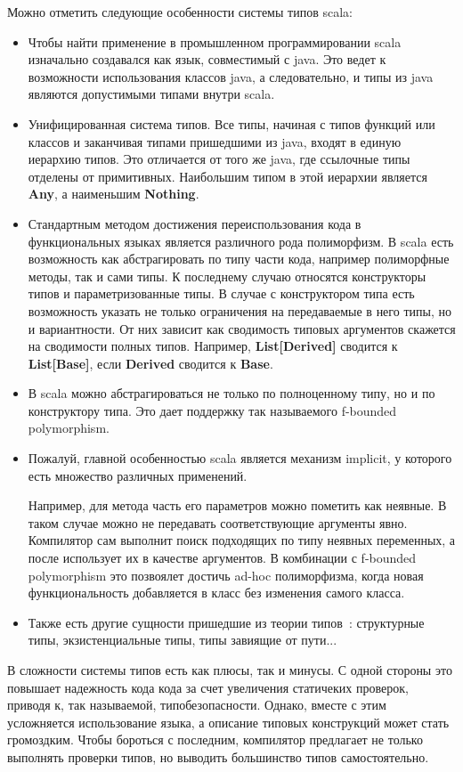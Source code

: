 Можно отметить следующие особенности системы типов scala:
\begin{itemize}
  \item Чтобы найти применение в промышленном программировании scala изначально
  создавался как язык, совместимый с java.
  Это ведет к возможности использования классов java, а следовательно, и типы
  из java являются допустимыми типами внутри scala.
  \item Унифицированная система типов. Все типы, начиная с типов функций или
  классов и заканчивая типами пришедшими из java, входят в единую иерархию типов.
  Это отличается от того же java, где ссылочные типы отделены от примитивных.
  Наибольшим типом в этой иерархии является \textbf{Any}, а наименьшим
  \textbf{Nothing}.
  \item Стандартным методом достижения переиспользования кода
  в функциональных языках является различного рода полиморфизм.
  В scala есть возможность как абстрагировать по типу части кода,
  например полиморфные методы, так и сами типы.
  К последнему случаю относятся конструкторы типов и параметризованные типы.
  В случае с конструктором типа есть возможность указать не только ограничения
  на передаваемые в него типы, но и вариантности.
  От них зависит как сводимость типовых аргументов скажется на
  сводимости полных типов.
  Например, \textbf{List[Derived]} сводится к \textbf{List[Base]}, если
  \textbf{Derived} сводится к \textbf{Base}.
  \item В scala можно абстрагироваться не только по полноценному типу,
  но и по конструктору типа.
  Это дает поддержку так называемого f-bounded polymorphism.
  \item Пожалуй, главной особенностью scala является механизм implicit, у
  которого есть множество различных применений.

  Например, для метода часть его параметров можно пометить как неявные.
  В таком случае можно не передавать соответствующие аргументы явно.
  Компилятор сам выполнит поиск подходящих по типу неявных переменных,
  а после использует их в качестве аргументов.
  В комбинации с f-bounded polymorphism это позвоялет достичь ad-hoc полиморфизма,
  когда новая функциональность добавляется в класс без изменения самого
  класса.
  \item Также есть другие сущности пришедшие из теории типов~\cite{type_theory}:
  структурные типы, экзистенциальные типы, типы завиящие от пути...
\end{itemize}

В сложности системы типов есть как плюсы, так и минусы.
С одной стороны это повышает надежность кода кода за счет увеличения статичеких
проверок, приводя к, так называемой, типобезопасности.
Однако, вместе с этим усложняется использование языка, а описание типовых
конструкций может стать громоздким.
Чтобы бороться с последним, компилятор предлагает не только выполнять проверки
типов, но выводить большинство типов самостоятельно.

